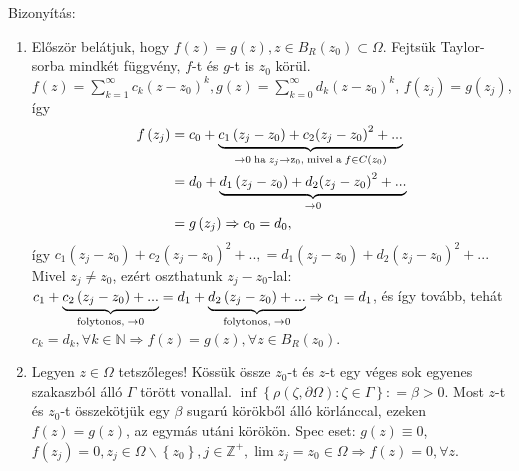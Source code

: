 \documentclass[12pt,a4paper]{scrartcl}
\providecommand{\tightlist}{%
  \setlength{\itemsep}{0pt}\setlength{\parskip}{0pt}}
\newenvironment{bizonyitas}{}{}
\begin{document}
\begin{bizonyitas}

Bizonyítás:

\begin{enumerate}
\def\labelenumi{\arabic{enumi}.}
\tightlist
\item
  Először belátjuk, hogy
  \(f\left( z \right) = g\left( z \right),z \in B_{R}\left( z_{0} \right) \subset \Omega\).
  Fejtsük Taylor-sorba mindkét függvény, \(f\)-t és \(g\)-t is \(z_{0}\)
  körül.
  \(f\left( z \right) = {\sum\limits_{k = 1}^{\infty}{c_{k}\left( {z - z_{0}} \right)^{k}}},g\left( z \right) = {\sum\limits_{k = 0}^{\infty}{d_{k}\left( {z - z_{0}} \right)^{k}}}\),
  \(f\left( z_{j} \right) = g\left( z_{j} \right)\), így
  \[\begin{aligned}
    f\left( {{z_j}} \right) &  = {c_0} + \underbrace {{c_1}\left( {{z_j} - {z_0}} \right) + {c_2}{{\left( {{z_j} - {z_0}} \right)}^2} + ...}_{ \to 0{\text{\;ha\;}}{z_j} \to {{\text{z}}_0}{\text{,\;mivel\;a\;}}f \in C\left( {{z_0}} \right)} \\ 
     &  = {d_0} + \underbrace {{d_1}\left( {{z_j} - {z_0}} \right) + {d_2}{{\left( {{z_j} - {z_0}} \right)}^2} + ...}_{ \to 0} \\ 
     &  = g\left( {{z_j}} \right) \Rightarrow {c_0} = {d_0}, \\ 
  \end{aligned} \] így
  \(c_{1}\left( {z_{j} - z_{0}} \right) + c_{2}\left( {z_{j} - z_{0}} \right)^{2} + .., = d_{1}\left( {z_{j} - z_{0}} \right) + d_{2}\left( {z_{j} - z_{0}} \right)^{2} + ...\)
  Mivel \(z_{j} \neq z_{0}\), ezért oszthatunk \(z_{j} - z_{0}\)-lal:
  \({c_1} + \underbrace {{c_2}\left( {{z_j} - {z_0}} \right) + ...}_{{\text{folytonos}}{\text{,\;}} \to {\text{0}}} = {d_1} + \underbrace {{d_2}\left( {{z_j} - {z_0}} \right) + ...}_{{\text{folytonos}}{\text{,\;}} \to 0} \Rightarrow {c_1} = {d_1}\),
  és így tovább, tehát
  \(\left. c_{k} = d_{k},\forall k \in {\mathbb{N}}\Rightarrow f\left( z \right) = g\left( z \right),\forall z \in B_{R}\left( z_{0} \right) \right.\).
\item
  Legyen \(z \in \Omega\) tetszőleges! Kössük össze \(z_{0}\)-t és
  \(z\)-t egy véges sok egyenes szakaszból álló \(\Gamma\) törött
  vonallal.
  \(\inf\left\{ {\rho\left( {\zeta,\partial\Omega} \right):\zeta \in \Gamma} \right\}: = \beta > 0\).
  Most \(z\)-t és \(z_{0}\)-t összekötjük egy \(\beta\) sugarú körökből
  álló körlánccal, ezeken \(f\left( z \right) = g\left( z \right)\), az
  egymás utáni körökön. Spec eset: \(g\left( z \right) \equiv 0\),
  \(\left. f\left( z_{j} \right) = 0,z_{j} \in \Omega\backslash\left\{ z_{0} \right\},j \in {\mathbb{Z}}^{+},\lim z_{j} = z_{0} \in \Omega\Rightarrow f\left( z \right) = 0,\forall z \right.\).
\end{enumerate}

\end{bizonyitas}
\end{document}
